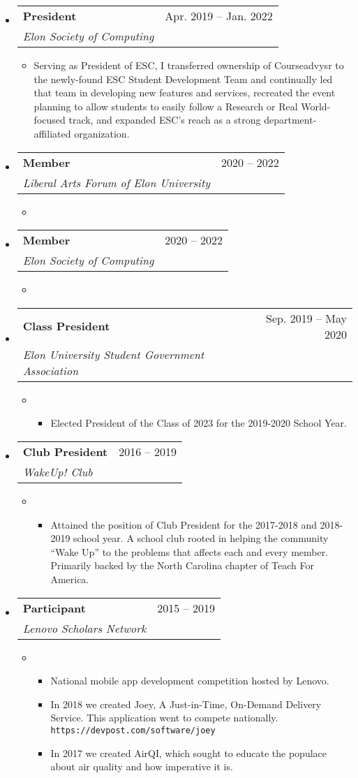 \documentclass[letterpaper,10pt,draft]{article}
\makeatletter
\newcommand{\openitem}[2]{\item[] \textbf{#1} #2\vspace{2pt}}
\newcommand{\secsubheading}[4]{
\vspace{2pt}
\begin{tabular*}{6.86in}{l@{\cftdotfill{\cftsecdotsep}\extracolsep{\fill}}r}
		\textbf{#1} & #3 -- #4\\
		\textit{#2} \\
\end{tabular*}
}
\newcommand{\secitem}[5]{
	\item[]
		\secsubheading{#1}{#2}{#3}{#4}
		\vspace{-10pt}
		\begin{itemize}
			\item[]{#5}
		\end{itemize}
}
\makeatother
\begin{document}
	\begin{itemize}
		\secitem{President}
			{Elon Society of Computing}
			{Apr. 2019}{Jan. 2022}
			{Serving as President of ESC, I transferred ownership of Courseadvysr to the newly-found ESC Student Development Team and continually led that team in developing new features and services, recreated the event planning to allow students to easily follow a Research or Real World-focused track, and expanded ESC’s reach as a strong department-affiliated organization.}
		\secitem{Member}
			{Liberal Arts Forum of Elon University}
			{2020}{2022}
			{}
		
		\secitem{Member}
			{Elon Society of Computing}
			{2020}{2022}
			{}
		\secitem{Class President}
			{Elon University Student Government Association}
			{Sep. 2019}{May 2020}
			{
				\begin{itemize}
					\openitem{}{Elected President of the Class of 2023 for the 2019-2020 School Year.}
				\end{itemize}
			}

		\secitem{Club President}
			{WakeUp! Club}
			{2016}{2019}
			{
				\begin{itemize}
					\openitem{}{Attained the position of Club President for the 2017-2018 and 2018-2019 school year. A school club rooted in helping the community “Wake Up” to the problems that affects each and every member. Primarily backed by the North Carolina chapter of Teach For America.}
				\end{itemize}
			}

		\secitem{Participant}
			{Lenovo Scholars Network}
			{2015}{2019}
			{
				\begin{itemize}
					\openitem{}{National mobile app development competition hosted by Lenovo.}
					\openitem{}{In 2018 we created Joey, A Just-in-Time, On-Demand Delivery Service. This application went to compete nationally. \texttt{https://devpost.com/software/joey}}
					\openitem{}{In 2017 we created AirQI, which sought to educate the populace about air quality and how imperative it is.}
				\end{itemize}
			}
	\end{itemize}
\end{document}

